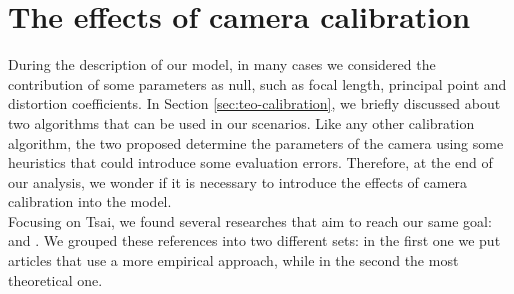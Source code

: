 \section{The effects of camera calibration}
\label{sec:calib-model}

During the description of our model, in many cases we considered the contribution of some parameters as null, such as focal length, principal point and distortion coefficients. In Section \ref{sec:teo-calibration}, we briefly discussed about two algorithms that can be used in our scenarios. Like any other calibration algorithm, the two proposed determine the parameters of the camera using some heuristics that could introduce some evaluation errors. Therefore, at the end of our analysis, we wonder if it is necessary to introduce the effects of camera calibration into the model. \\

Focusing on Tsai, we found several researches that aim to reach our same goal: 
\cite{Brauer2017}
\cite{fujimoto-teo-err-an}
\cite{7153104}
\cite{Kopparapu:2001:ENC:569876.569877}
\cite{SALVI20021617}
\cite{Samper2013}
\cite{4129503} and 
\cite{159901}.
We grouped these references into two different sets: in the first one we put articles that use a more empirical approach, while in the second the most theoretical one. \\

